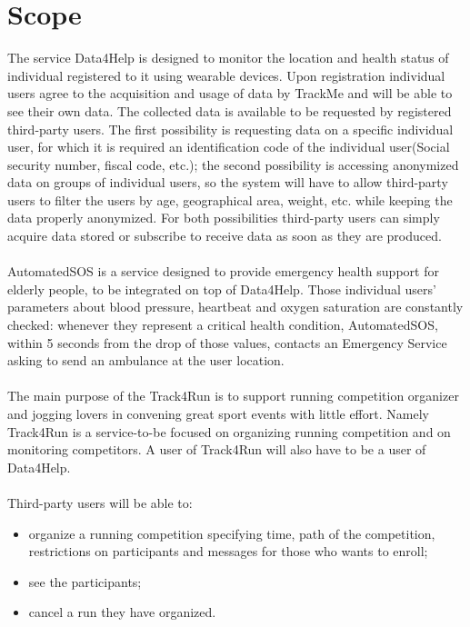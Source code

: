 \section{Scope}
The service Data4Help is designed to monitor the location and health status of individual registered to it using wearable devices. Upon registration individual users agree to the acquisition and usage of data by TrackMe and will be able to see their own data.
The collected data is available to be requested by registered third-party users. The first possibility is requesting data on a specific individual user, for which it is required an identification code of the individual user(Social security number, fiscal code, etc.); the second possibility is accessing anonymized data on groups of individual users, so the system will have to allow third-party users to filter the users by age, geographical area, weight, etc. while keeping the data properly anonymized.
For both possibilities third-party users can simply acquire data stored or subscribe to receive data as soon as they are produced.
\\
\\
AutomatedSOS is a service designed to provide emergency health support for elderly people, to be integrated on top of Data4Help. Those individual users’ parameters about blood pressure, heartbeat and oxygen saturation are constantly checked: whenever they represent a critical health condition, AutomatedSOS, within 5 seconds from the drop of those values, contacts an Emergency Service asking to send an ambulance at the user location.
\\
\\
The main purpose of the Track4Run is to support running competition organizer and jogging lovers in convening great sport events with little effort. Namely Track4Run is a service-to-be focused on organizing running competition and on monitoring competitors. A user of Track4Run will also have to be a user of Data4Help. 
\\ 
\\
Third-party users will be able to: 
\begin{itemize}
\item 
organize a running competition specifying time, path of the competition, restrictions on participants and messages for those who wants to enroll;
\item 
see the participants; 
\item 
cancel a run they have organized. 
\end{itemize}


